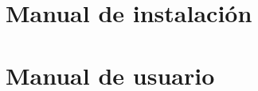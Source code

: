 \documentclass[a4paper,11pt]{book}
\begin{document}
\backmatter %

\begin{appendices}
\appendix
\chapter{Manual de instalación}


\chapter{Manual de usuario}

\end{appendices}

\clearpage
{}




\end{document}
